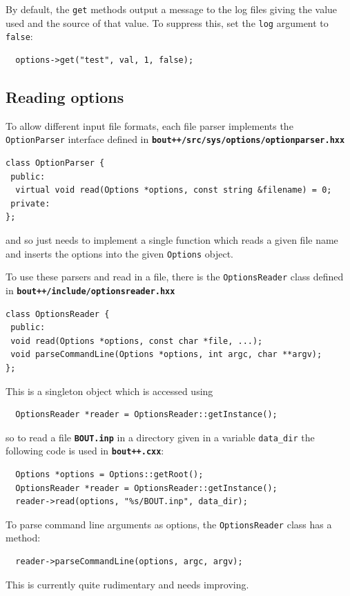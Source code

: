 \documentclass[12pt]{article}
\newcommand{\file}[1]{\texttt{\bf #1}}
\begin{document}
By default, the \lstinline!get! methods output a message to
the log files giving the value used and the source of that value.
To suppress this, set the \lstinline!log! argument to \lstinline!false!:
\begin{lstlisting}
  options->get("test", val, 1, false);
\end{lstlisting}

\subsection{Reading options}

To allow different input file formats, each file parser implements
the \lstinline!OptionParser! interface defined in
\file{bout++/src/sys/options/optionparser.hxx}
\begin{lstlisting}
class OptionParser {
 public:
  virtual void read(Options *options, const string &filename) = 0;
 private:
};
\end{lstlisting}
and so just needs to implement a single function which reads a
given file name and inserts the options into the given \lstinline!Options!
object.

To use these parsers and read in a file, there is the
\lstinline!OptionsReader! class defined in
\file{bout++/include/optionsreader.hxx} 
\begin{lstlisting}
class OptionsReader {
 public:
 void read(Options *options, const char *file, ...);
 void parseCommandLine(Options *options, int argc, char **argv);
};
\end{lstlisting}
This is a singleton object which is accessed using
\begin{lstlisting}
  OptionsReader *reader = OptionsReader::getInstance();
\end{lstlisting}
so to read a file \file{BOUT.inp} in a directory given in a variable
\lstinline!data_dir! the following code is used in \file{bout++.cxx}:
\begin{lstlisting}
  Options *options = Options::getRoot();
  OptionsReader *reader = OptionsReader::getInstance();
  reader->read(options, "%s/BOUT.inp", data_dir);
\end{lstlisting}

To parse command line arguments as options, the \lstinline!OptionsReader!
class has a method:
\begin{lstlisting}
  reader->parseCommandLine(options, argc, argv);
\end{lstlisting}
This is currently quite rudimentary and needs improving.
\end{document}
